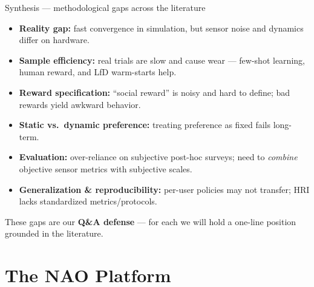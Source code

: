 \documentclass[aspectratio=169,10pt]{beamer}
\begin{document}
\begin{frame}{Synthesis --- methodological gaps across the literature}
  \begin{itemize}
    \item \textbf{Reality gap:} fast convergence in simulation, but sensor noise and dynamics differ on hardware.
    \item \textbf{Sample efficiency:} real trials are slow and cause wear --- few-shot learning, human reward, and LfD warm-starts help.
    \item \textbf{Reward specification:} ``social reward'' is noisy and hard to define; bad rewards yield awkward behavior.
    \item \textbf{Static vs.\ dynamic preference:} treating preference as fixed fails long-term.
    \item \textbf{Evaluation:} over-reliance on subjective post-hoc surveys; need to \emph{combine} objective sensor metrics with subjective scales.
    \item \textbf{Generalization \& reproducibility:} per-user policies may not transfer; HRI lacks standardized metrics/protocols.
  \end{itemize}
  \begin{block}{}
    \footnotesize These gaps are our \textbf{Q\&A defense} --- for each we will hold a one-line position grounded in the literature.
  \end{block}
\end{frame}

\section{The NAO Platform}
\end{document}

